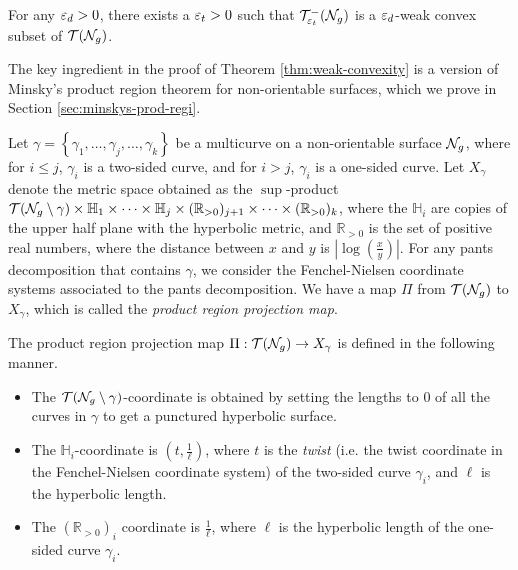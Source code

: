 \begin{theorem}
  \label{thm:weak-convexity}
  For any $\varepsilon_d > 0$, there exists a $\varepsilon_t > 0$ such that $\mathcal{T}_{\varepsilon_t}^{-}(\mathcal{N}_g)$ is a $\varepsilon_d$-weak convex subset of $\mathcal{T}(\mathcal{N}_g)$.
\end{theorem}

The key ingredient in the proof of Theorem \ref{thm:weak-convexity} is a version of Minsky's product region theorem \cite[Theorem 6.1]{1077244446} for non-orientable surfaces, which we prove in Section \ref{sec:minskys-prod-regi}.

Let $\gamma = \left\{ \gamma_1, \ldots, \gamma_j, \ldots, \gamma_k \right\}$ be a multicurve on a non-orientable surface $\mathcal{N}_g$, where for $i \leq j$, $\gamma_i$ is a two-sided curve, and for $i > j$, $\gamma_i$ is a one-sided curve.
Let $X_\gamma$ denote the metric space obtained as the $\sup$-product $\mathcal{T}(\mathcal{N}_g \setminus \gamma) \times \mathbb{H}_1 \times \cdots \times \mathbb{H}_j \times (\mathbb{R}_{>0})_{j+1} \times \cdots \times (\mathbb{R}_{>0})_k$, where the $\mathbb{H}_i$ are copies of the upper half plane with the hyperbolic metric, and $\mathbb{R}_{>0}$ is the set of positive real numbers, where the distance between $x$ and $y$ is $\left| \log \left( \frac{x}{y} \right) \right|$.
For any pants decomposition that contains $\gamma$, we consider the Fenchel-Nielsen coordinate systems associated to the pants decomposition.
We have a map $\Pi$ from $\mathcal{T}(\mathcal{N}_g)$ to $X_\gamma$, which is called the \emph{product region projection map}.
\begin{definition}
  The product region projection map $\Pi: \mathcal{T}(\mathcal{N}_g) \to X_\gamma$ is defined in the following manner.
  \begin{itemize}
  \item The $\mathcal{T}(\mathcal{N}_g \setminus \gamma)$-coordinate is obtained by setting the lengths to $0$ of all the curves in $\gamma$ to get a punctured hyperbolic surface.
  \item The $\mathbb{H}_i$-coordinate is $\left( t, \frac{1}{\ell} \right)$, where $t$ is the \emph{twist} (i.e. the twist coordinate in the Fenchel-Nielsen coordinate system) of the two-sided curve $\gamma_i$, and $\ell$ is the hyperbolic length.
  \item The $(\mathbb{R}_{>0})_i$ coordinate is $\frac{1}{\ell}$, where $\ell$ is the hyperbolic length of the one-sided curve $\gamma_i$.
  \end{itemize}
\end{definition}

